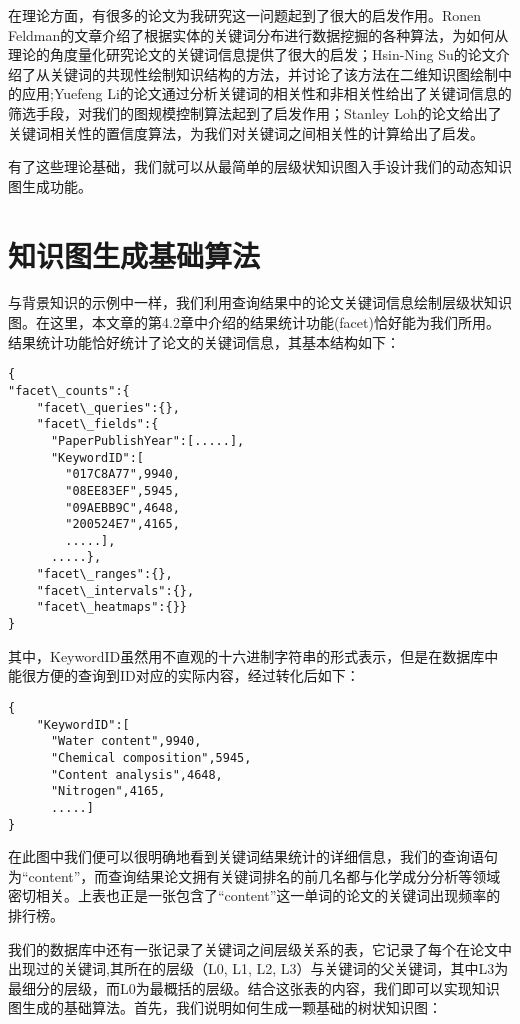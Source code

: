 在理论方面，有很多的论文为我研究这一问题起到了很大的启发作用。Ronen Feldman的文章介绍了根据实体的关键词分布进行数据挖掘的各种算法，为如何从理论的角度量化研究论文的关键词信息提供了很大的启发；Hsin-Ning Su的论文介绍了从关键词的共现性绘制知识结构的方法，并讨论了该方法在二维知识图绘制中的应用;Yuefeng Li的论文通过分析关键词的相关性和非相关性给出了关键词信息的筛选手段，对我们的图规模控制算法起到了启发作用；Stanley Loh的论文给出了关键词相关性的置信度算法，为我们对关键词之间相关性的计算给出了启发。

有了这些理论基础，我们就可以从最简单的层级状知识图入手设计我们的动态知识图生成功能。

\section{知识图生成基础算法}
与背景知识的示例中一样，我们利用查询结果中的论文关键词信息绘制层级状知识图。在这里，本文章的第4.2章中介绍的结果统计功能(facet)恰好能为我们所用。结果统计功能恰好统计了论文的关键词信息，其基本结构如下：
\begin{lstlisting}[caption={关键词结果统计}, label=kwfacet, escapeinside="", numbers=none]
{
"facet\_counts":{
    "facet\_queries":{},
    "facet\_fields":{
      "PaperPublishYear":[.....],
      "KeywordID":[
        "017C8A77",9940,
        "08EE83EF",5945,
        "09AEBB9C",4648,
        "200524E7",4165,
        .....],
      .....},
    "facet\_ranges":{},
    "facet\_intervals":{},
    "facet\_heatmaps":{}}
}
\end{lstlisting}

其中，KeywordID虽然用不直观的十六进制字符串的形式表示，但是在数据库中能很方便的查询到ID对应的实际内容，经过转化后如下：
\begin{lstlisting}[caption={关键词结果统计\_新}, label=kwfacet2, escapeinside="", numbers=none]
{
    "KeywordID":[
      "Water content",9940,
      "Chemical composition",5945,
      "Content analysis",4648,
      "Nitrogen",4165,
      .....]
}
\end{lstlisting}

在此图中我们便可以很明确地看到关键词结果统计的详细信息，我们的查询语句为“content”，而查询结果论文拥有关键词排名的前几名都与化学成分分析等领域密切相关。上表也正是一张包含了“content”这一单词的论文的关键词出现频率的排行榜。

我们的数据库中还有一张记录了关键词之间层级关系的表，它记录了每个在论文中出现过的关键词,其所在的层级（L0, L1, L2, L3）与关键词的父关键词，其中L3为最细分的层级，而L0为最概括的层级。结合这张表的内容，我们即可以实现知识图生成的基础算法。首先，我们说明如何生成一颗基础的树状知识图：

